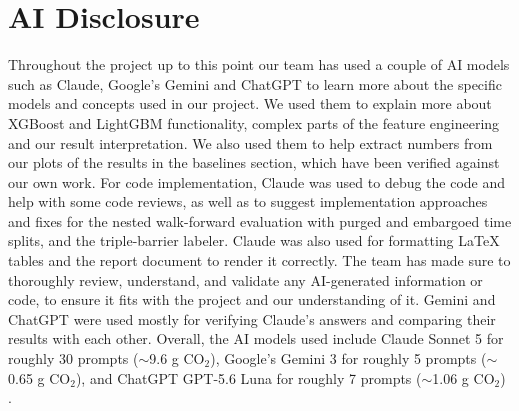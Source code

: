 \documentclass[11pt]{article}
\begin{document}
\section*{AI Disclosure}

Throughout the project up to this point our team has used a couple of AI models such as Claude, Google's Gemini and ChatGPT to learn more about the specific models and concepts used in our project. We used them to explain more about XGBoost and LightGBM functionality, complex parts of the feature engineering and our result interpretation. We also used them to help extract numbers from our plots of the results in the baselines section, which have been verified against our own work. For code implementation, Claude was used to debug the code and help with some code reviews, as well as to suggest implementation approaches and fixes for the nested walk-forward evaluation with purged and embargoed time splits, and the triple-barrier labeler. Claude was also used for formatting \LaTeX{} tables and the report document to render it correctly. The team has made sure to thoroughly review, understand, and validate any AI-generated information or code, to ensure it fits with the project and our understanding of it. Gemini and ChatGPT were used mostly for verifying Claude's answers and comparing their results with each other. Overall, the AI models used include Claude Sonnet 5 for roughly 30 prompts ($\sim$9.6 g CO$_2$), Google's Gemini 3 for roughly 5 prompts ($\sim$0.65 g CO$_2$), and ChatGPT GPT-5.6 Luna for roughly 7 prompts ($\sim$1.06 g CO$_2$) \citep{devera2026aienergy}.






\end{document}

